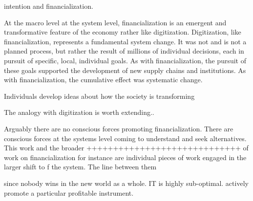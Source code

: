 intention and financialization.




At the macro level at the system level, financialization is an emergent and transformative feature of the economy rather like digitization. Digitization, like financialization, represents a fundamental system  change. It was not and is not a planned process, but rather the result of millions of individual decisions, each in pursuit of specific, local, individual goals.  As with  financialization, the pursuit of these goals supported the development of new supply chains and institutions.  As with  financialization, the cumulative effect was systematic change.

Individuals develop ideas about how the society is transforming

The analogy with digitization is worth extending..

Arguably there are no conscious forces promoting financialization. There are conscious forces at the systems level coming to understand and seek alternatives. This work and the broader 
+++++++++++++++++++++++++++++
of work on financialization for instance are individual pieces of work engaged in  the larger shift to f the system. The line between them 

since nobody wins in the new world as a whole. IT is highly sub-optimal. actively promote a particular profitable instrument.


